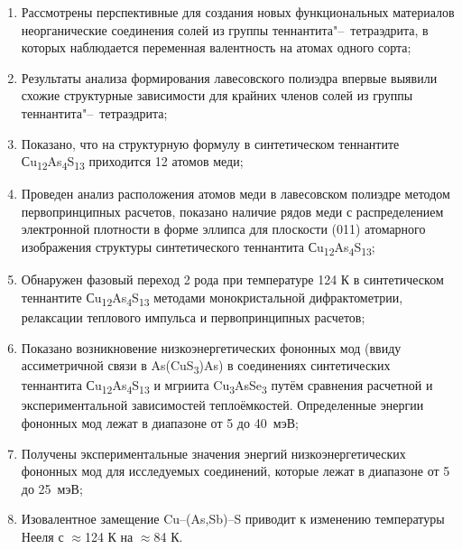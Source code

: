 \begin{enumerate}
						\item Рассмотрены перспективные для создания новых функциональных материалов неорганические соединения солей из группы теннантита"--~тетраэдрита, в которых наблюдается переменная валентность на атомах одного сорта;
						\item Результаты анализа формирования лавесовского полиэдра впервые выявили схожие структурные зависимости для крайних членов солей из группы теннантита"--~тетраэдрита;
						\item Показано, что на структурную формулу в синтетическом теннантите Сu\textsubscript{12}As\textsubscript{4}S\textsubscript{13} приходится 12 атомов меди;
						\item Проведен анализ расположения атомов меди в лавесовском полиэдре методом первопринципных расчетов, показано наличие рядов меди с распределением электронной плотности в форме эллипса для плоскости (011) атомарного изображения структуры синтетического теннантита Сu\textsubscript{12}As\textsubscript{4}S\textsubscript{13};
						\item Обнаружен фазовый переход 2 рода при температуре 124 К в синтетическом теннантите Сu\textsubscript{12}As\textsubscript{4}S\textsubscript{13} методами монокристальной дифрактометрии, релаксации теплового импульса и  первопринципных расчетов;
						\item Показано возникновение низкоэнергетических фононных мод (ввиду  ассиметричной связи в As(CuS\textsubscript{3})As) в соединениях синтетических теннантита Сu\textsubscript{12}As\textsubscript{4}S\textsubscript{13} и мгриита Cu\textsubscript{3}AsSe\textsubscript{3} путём сравнения расчетной и экспериментальной зависимостей теплоёмкостей. Определенные энергии  фононных мод  лежат в диапазоне от 5 до 40~мэВ;
						\item Получены экспериментальные значения энергий низкоэнергетических фононных мод для исследуемых соединений, которые лежат в диапазоне от 5 до 25~мэВ;
						\item Изовалентное замещение Cu--(As,Sb)--S приводит к изменению температуры Нееля с $\approx$124 К на $\approx$84 К.

\end{enumerate}
